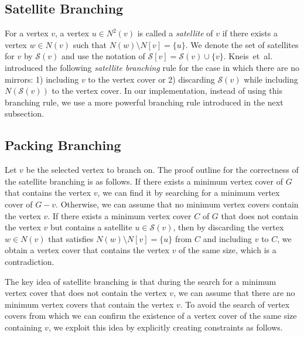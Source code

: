 \documentclass[11pt]{article}
\begin{document}
\subsection{Satellite Branching}
For a vertex $v$, a vertex $u\in N^2(v)$ is called a \emph{satellite} of $v$ if there exists a vertex $w\in N(v)$ such
that $N(w)\setminus N[v]=\{u\}$.
We denote the set of satellites for $v$ by $\mathcal{S}(v)$ and use the notation of
$\mathcal{S}[v]=\mathcal{S}(v)\cup\{v\}$.
Kneis~et~al.~\cite{DBLP:conf/fsttcs/KneisLR09} introduced the following \emph{satellite branching} rule for the case
in which there are no mirrors: 1) including $v$ to the vertex cover or 2) discarding $\mathcal{S}(v)$ while including
$N(\mathcal{S}(v))$ to the vertex cover.
In our implementation, instead of using this branching rule, we use a more powerful branching rule introduced in the
next subsection.

\subsection{Packing Branching}\label{sec:branching:packing}
Let $v$ be the selected vertex to branch on.
The proof outline for the correctness of the satellite branching is as follows.
If there exists a minimum vertex cover of $G$ that contains the vertex $v$, we can find it by searching for a minimum vertex
cover of $G-v$.
Otherwise, we can assume that no minimum vertex covers contain the vertex $v$.
If there exists a minimum vertex cover $C$ of $G$ that does not contain the vertex $v$ but contains a satellite
$u\in\mathcal{S}(v)$, then by discarding the vertex $w\in N(v)$ that satisfies $N(w)\setminus N[v]=\{u\}$ from $C$ and
including $v$ to $C$, we obtain a vertex cover that contains the vertex $v$ of the same size, which is a contradiction.

The key idea of satellite branching is that during the search for a minimum vertex cover that does not contain
the vertex $v$, we can assume that there are no minimum vertex covers that contain the vertex $v$.
To avoid the search of vertex covers from which we can confirm the existence of a vertex cover of the same size containing $v$,
we exploit this idea by explicitly creating constraints as follows.
\end{document}
